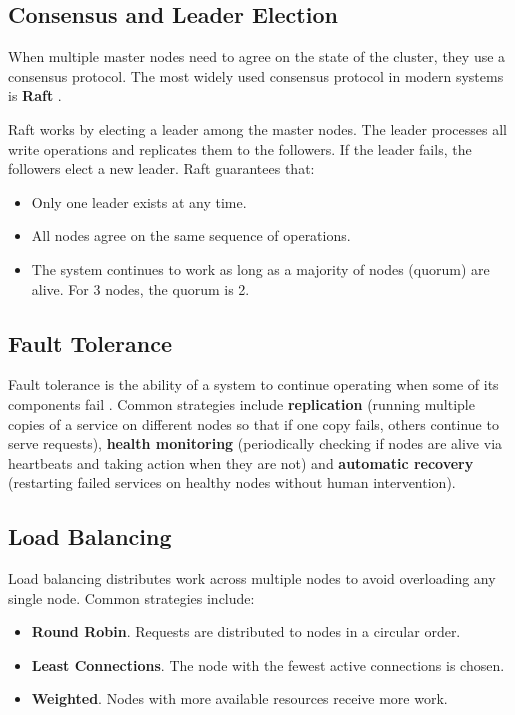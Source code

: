 \subsection{Consensus and Leader Election}

When multiple master nodes need to agree on the state of the cluster, they use a consensus protocol. The most widely used consensus protocol in modern systems is \textbf{Raft} \cite{inproc:ongaro:raft:2014}.

Raft works by electing a leader among the master nodes. The leader processes all write operations and replicates them to the followers. If the leader fails, the followers elect a new leader. Raft guarantees that:

\begin{itemize}
    \item Only one leader exists at any time.
    \item All nodes agree on the same sequence of operations.
    \item The system continues to work as long as a majority of nodes (quorum) are alive. For 3 nodes, the quorum is 2.
\end{itemize}

\subsection{Fault Tolerance}

Fault tolerance is the ability of a system to continue operating when some of its components fail \cite{book:tanenbaum:ds:2017}. Common strategies include \textbf{replication} (running multiple copies of a service on different nodes so that if one copy fails, others continue to serve requests), \textbf{health monitoring} (periodically checking if nodes are alive via heartbeats and taking action when they are not) and \textbf{automatic recovery} (restarting failed services on healthy nodes without human intervention).

\subsection{Load Balancing}

Load balancing distributes work across multiple nodes to avoid overloading any single node. Common strategies include:

\begin{itemize}
    \item \textbf{Round Robin}. Requests are distributed to nodes in a circular order.
    \item \textbf{Least Connections}. The node with the fewest active connections is chosen.
    \item \textbf{Weighted}. Nodes with more available resources receive more work.
\end{itemize}

